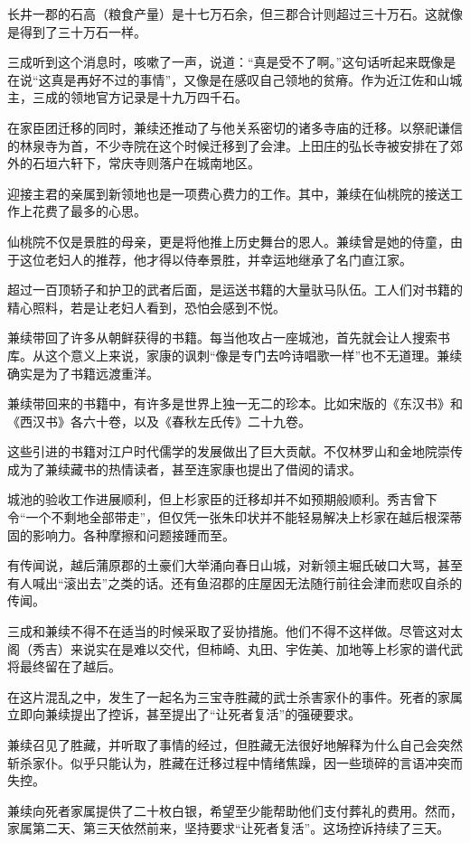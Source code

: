 \documentclass[
]{article}
\begin{document}
长井一郡的石高（粮食产量）是十七万石余，但三郡合计则超过三十万石。这就像是得到了三十万石一样。

三成听到这个消息时，咳嗽了一声，说道：``真是受不了啊。''这句话听起来既像是在说``这真是再好不过的事情''，又像是在感叹自己领地的贫瘠。作为近江佐和山城主，三成的领地官方记录是十九万四千石。

在家臣团迁移的同时，兼续还推动了与他关系密切的诸多寺庙的迁移。以祭祀谦信的林泉寺为首，不少寺院在这个时候迁移到了会津。上田庄的弘长寺被安排在了郊外的石垣六轩下，常庆寺则落户在城南地区。

迎接主君的亲属到新领地也是一项费心费力的工作。其中，兼续在仙桃院的接送工作上花费了最多的心思。

仙桃院不仅是景胜的母亲，更是将他推上历史舞台的恩人。兼续曾是她的侍童，由于这位老妇人的推荐，他才得以侍奉景胜，并幸运地继承了名门直江家。

超过一百顶轿子和护卫的武者后面，是运送书籍的大量驮马队伍。工人们对书籍的精心照料，若是让老妇人看到，恐怕会感到不悦。

兼续带回了许多从朝鲜获得的书籍。每当他攻占一座城池，首先就会让人搜索书库。从这个意义上来说，家康的讽刺``像是专门去吟诗唱歌一样''也不无道理。兼续确实是为了书籍远渡重洋。

兼续带回来的书籍中，有许多是世界上独一无二的珍本。比如宋版的《东汉书》和《西汉书》各六十卷，以及《春秋左氏传》二十九卷。

这些引进的书籍对江户时代儒学的发展做出了巨大贡献。不仅林罗山和金地院崇传成为了兼续藏书的热情读者，甚至连家康也提出了借阅的请求。

城池的验收工作进展顺利，但上杉家臣的迁移却并不如预期般顺利。秀吉曾下令``一个不剩地全部带走''，但仅凭一张朱印状并不能轻易解决上杉家在越后根深蒂固的影响力。各种摩擦和问题接踵而至。

有传闻说，越后蒲原郡的土豪们大举涌向春日山城，对新领主堀氏破口大骂，甚至有人喊出``滚出去''之类的话。还有鱼沼郡的庄屋因无法随行前往会津而悲叹自杀的传闻。

三成和兼续不得不在适当的时候采取了妥协措施。他们不得不这样做。尽管这对太阁（秀吉）来说实在是难以交代，但柿崎、丸田、宇佐美、加地等上杉家的谱代武将最终留在了越后。

在这片混乱之中，发生了一起名为三宝寺胜藏的武士杀害家仆的事件。死者的家属立即向兼续提出了控诉，甚至提出了``让死者复活''的强硬要求。

兼续召见了胜藏，并听取了事情的经过，但胜藏无法很好地解释为什么自己会突然斩杀家仆。似乎只能认为，胜藏在迁移过程中情绪焦躁，因一些琐碎的言语冲突而失控。

兼续向死者家属提供了二十枚白银，希望至少能帮助他们支付葬礼的费用。然而，家属第二天、第三天依然前来，坚持要求``让死者复活''。这场控诉持续了三天。
\end{document}
